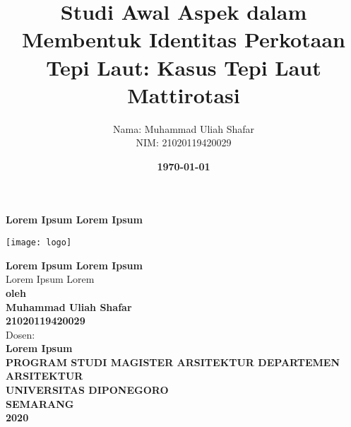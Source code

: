 \documentclass[11pt]{simart} %
\title{Studi Awal Aspek dalam Membentuk Identitas Perkotaan Tepi Laut: Kasus Tepi Laut Mattirotasi}
\date{\textbf{\today}}
\author{
\begin{tabular}{@{}ll@{}}
	Nama & : Muhammad Uliah Shafar\\
	NIM & : 21020119420029\\
\end{tabular}
}
\begin{document}
\thispagestyle{empty}
\begin{center}
	\begin{huge}
		\bf{Lorem Ipsum Lorem Ipsum}
	\end{huge}

	\vspace{20pt}
	\texttt{[image: logo]} \\

	\vspace*{35pt}

	\begin{large}
		\textbf{Lorem Ipsum Lorem Ipsum} \\
		Lorem Ipsum Lorem\\

		\vspace{20pt}
		\textbf{oleh\\
			\vspace{20pt}
			Muhammad Uliah Shafar\\21020119420029}\\

		\vspace{20pt}
		Dosen: \\
		\textbf{Lorem Ipsum}\\



		\vspace{60pt}
		\textbf{PROGRAM STUDI MAGISTER ARSITEKTUR DEPARTEMEN ARSITEKTUR\\
			UNIVERSITAS DIPONEGORO\\
			SEMARANG\\
			2020
		}
	\end{large}
\end{center}
\clearpage

\maketitle %

\end{document}

